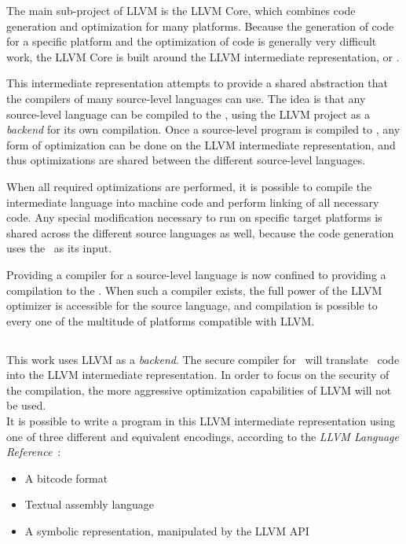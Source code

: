 The main sub-project of LLVM is the LLVM Core, which combines code generation and optimization for many platforms.
Because the generation of code for a specific platform and the optimization of code is generally very difficult work, the LLVM Core is built around the LLVM intermediate representation, or \LLVMIR.

This intermediate representation attempts to provide a shared abstraction that the compilers of many source-level languages can use.
The idea is that any source-level language can be compiled to the \LLVMIR, using the LLVM project as a \emph{backend} for its own compilation.
Once a source-level program is compiled to \LLVMIR, any form of optimization can be done on the LLVM intermediate representation, and thus optimizations are shared between the different source-level languages.

When all required optimizations are performed, it is possible to compile the intermediate language into machine code and perform linking of all necessary code.
Any special modification necessary to run on specific target platforms is shared across the 
different source languages as well, because the code generation uses the \LLVMIR\ as its input.

Providing a compiler for a source-level language is now confined to providing a compilation to the \LLVMIR.
When such a compiler exists, the full power of the LLVM optimizer is accessible for the source language, and compilation is possible to every one of the multitude of platforms compatible with LLVM.

\subsection{\LLVMIR}
This work uses LLVM as a \emph{backend}.
The secure compiler for \MiniML\ will translate \MiniML\ code into the LLVM intermediate representation.
In order to focus on the security of the compilation, the more aggressive optimization capabilities of LLVM will not be used.
\\[1em]
It is possible to write a program in this LLVM intermediate representation using one of three different and equivalent encodings, according to the \emph{LLVM Language Reference}~\cite{LLVMFAQ}:
\begin{itemize}
\item A bitcode format
\item Textual assembly language
\item A symbolic representation, manipulated by the LLVM API
\end{itemize}

